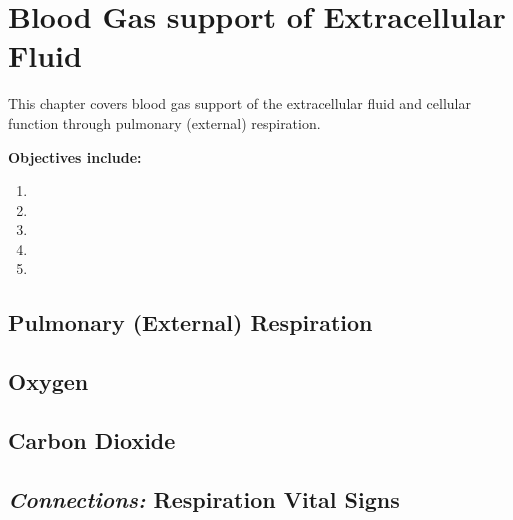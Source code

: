 \chapter{Blood Gas support of Extracellular Fluid}\label{chp:blood_oxygen}

\minitoc
This chapter covers blood gas support of the extracellular fluid and cellular function through pulmonary (external) respiration.

\vspace{5mm}

\textbf{Objectives include:}
\begin{enumerate}
    \item
    \item
    \item
    \item
    \item
\end{enumerate}

\section{Pulmonary (External) Respiration}

\section{Oxygen}

\section{Carbon Dioxide}

\section{\textit{Connections:} Respiration Vital Signs}

\printbibliography[heading=subbibintoc]